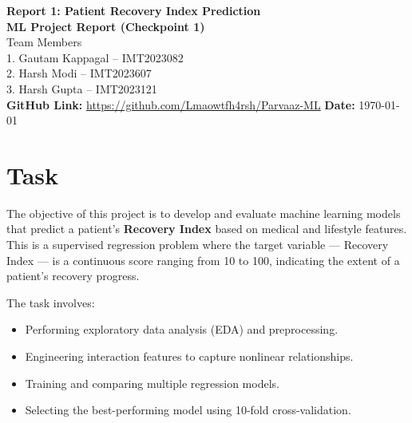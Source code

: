 \documentclass[12pt,a4paper]{article}
\begin{document}

\begin{center}
    \vspace*{1cm}
    \Huge \textbf{Report 1: Patient Recovery Index Prediction} \\
    \vspace{0.4cm}
    \Large \textbf{ML Project Report (Checkpoint 1)} \\
    \vspace{0.8cm}
    \large
    Team Members \\
    1. Gautam Kappagal – IMT2023082 \\
    2. Harsh Modi – IMT2023607 \\
    3. Harsh Gupta – IMT2023121 \\
    \vspace{0.6cm}
    \textbf{GitHub Link:} \href{https://github.com/Lmaowtfh4rsh/Parvaaz-ML}{https://github.com/Lmaowtfh4rsh/Parvaaz-ML}
    \vfill
    \textbf{Date:} \today
\end{center}

\newpage

\section{Task}

The objective of this project is to develop and evaluate machine learning models that predict a patient’s \textbf{Recovery Index} based on medical and lifestyle features. This is a supervised regression problem where the target variable --- Recovery Index --- is a continuous score ranging from 10 to 100, indicating the extent of a patient’s recovery progress.

The task involves:
\begin{itemize}
    \item Performing exploratory data analysis (EDA) and preprocessing.
    \item Engineering interaction features to capture nonlinear relationships.
    \item Training and comparing multiple regression models.
    \item Selecting the best-performing model using 10-fold cross-validation.
\end{itemize}

\end{document}
